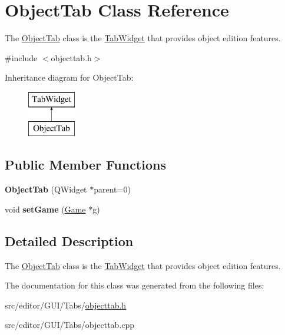 \hypertarget{class_object_tab}{\section{\-Object\-Tab \-Class \-Reference}
\label{class_object_tab}
}


\-The \hyperlink{class_object_tab}{\-Object\-Tab} class is the \hyperlink{class_tab_widget}{\-Tab\-Widget} that provides object edition features.  




{\ttfamily \#include $<$objecttab.\-h$>$}

\-Inheritance diagram for \-Object\-Tab\-:\begin{figure}[H]
\begin{center}
\leavevmode
\includegraphics[height=2.000000cm]{class_object_tab}
\end{center}
\end{figure}
\subsection*{\-Public \-Member \-Functions}
\begin{DoxyCompactItemize}
\item 
\hypertarget{class_object_tab_acf791488320fd040c1a04065abae73d3}{{\bfseries \-Object\-Tab} (\-Q\-Widget $\ast$parent=0)}\label{class_object_tab_acf791488320fd040c1a04065abae73d3}

\item 
\hypertarget{class_object_tab_a41031bc268bd880d0b08c0feb6fa8ac4}{void {\bfseries set\-Game} (\hyperlink{class_game}{\-Game} $\ast$g)}\label{class_object_tab_a41031bc268bd880d0b08c0feb6fa8ac4}

\end{DoxyCompactItemize}


\subsection{\-Detailed \-Description}
\-The \hyperlink{class_object_tab}{\-Object\-Tab} class is the \hyperlink{class_tab_widget}{\-Tab\-Widget} that provides object edition features. 

\-The documentation for this class was generated from the following files\-:\begin{DoxyCompactItemize}
\item 
src/editor/\-G\-U\-I/\-Tabs/\hyperlink{objecttab_8h}{objecttab.\-h}\item 
src/editor/\-G\-U\-I/\-Tabs/objecttab.\-cpp\end{DoxyCompactItemize}
